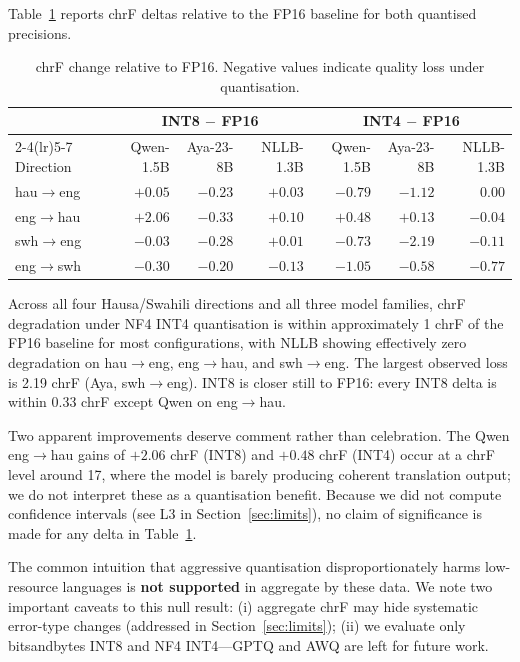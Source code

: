 \documentclass[11pt,a4paper]{article}
\begin{document}
Table~\ref{tab:delta} reports chrF deltas relative to the FP16 baseline
for both quantised precisions.

\begin{table}[h]
\centering
\small
\begin{tabular}{lrrrrrr}
\toprule
& \multicolumn{3}{c}{INT8 $-$ FP16} & \multicolumn{3}{c}{INT4 $-$ FP16} \\
\cmidrule(lr){2-4}\cmidrule(lr){5-7}
Direction & Qwen-1.5B & Aya-23-8B & NLLB-1.3B
          & Qwen-1.5B & Aya-23-8B & NLLB-1.3B \\
\midrule
hau$\rightarrow$eng & $+0.05$ & $-0.23$ & $+0.03$ & $-0.79$ & $-1.12$ & $0.00$ \\
eng$\rightarrow$hau & $+2.06$ & $-0.33$ & $+0.10$ & $+0.48$ & $+0.13$ & $-0.04$ \\
swh$\rightarrow$eng & $-0.03$ & $-0.28$ & $+0.01$ & $-0.73$ & $-2.19$ & $-0.11$ \\
eng$\rightarrow$swh & $-0.30$ & $-0.20$ & $-0.13$ & $-1.05$ & $-0.58$ & $-0.77$ \\
\bottomrule
\end{tabular}
\caption{chrF change relative to FP16. Negative values indicate
quality loss under quantisation.}
\label{tab:delta}
\end{table}

Across all four Hausa/Swahili directions and all three model families,
chrF degradation under NF4 INT4 quantisation is within approximately
1 chrF of the FP16 baseline for most configurations, with NLLB showing
effectively zero degradation on hau$\rightarrow$eng,
eng$\rightarrow$hau, and swh$\rightarrow$eng. The largest observed loss
is 2.19 chrF (Aya, swh$\rightarrow$eng). INT8 is closer still to FP16:
every INT8 delta is within 0.33 chrF except Qwen on
eng$\rightarrow$hau.

Two apparent improvements deserve comment rather than celebration. The
Qwen eng$\rightarrow$hau gains of $+2.06$ chrF (INT8) and $+0.48$ chrF
(INT4) occur at a chrF level around 17, where the model is barely
producing coherent translation output; we do not interpret these as a
quantisation benefit. Because we did not compute confidence intervals
(see L3 in Section~\ref{sec:limits}), no claim of significance is made
for any delta in Table~\ref{tab:delta}.

The common intuition that aggressive quantisation disproportionately
harms low-resource languages is \textbf{not supported} in aggregate by
these data. We note two important caveats to this null result:
(i) aggregate chrF may hide systematic error-type changes (addressed in
Section~\ref{sec:limits}); (ii) we evaluate only bitsandbytes INT8 and
NF4 INT4---GPTQ \cite{frantar2023gptq} and AWQ \cite{lin2024awq} are
left for future work.
\end{document}
